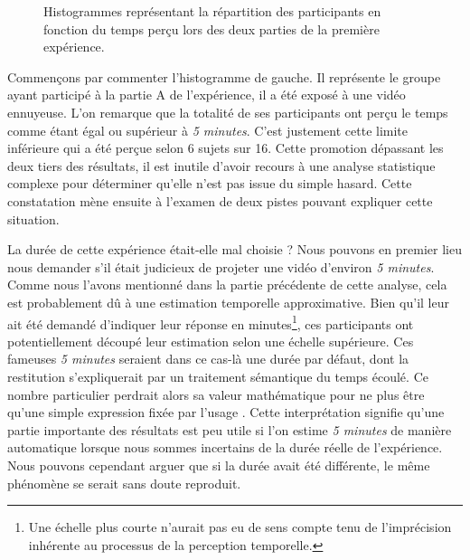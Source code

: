 \documentclass[12pt,fleqn,oneside,french,openany]{book} %
\begin{document}
\begin{figure}[h!]
\centering
\begin{minipage}[t]{.49\textwidth}
\end{minipage}
\hfill
\begin{minipage}[t]{.49\textwidth}
\end{minipage}
\caption{Histogrammes représentant la répartition des participants en fonction du temps perçu lors des deux parties de la première expérience.}
\end{figure}

Commençons par commenter l'histogramme de gauche. Il représente le groupe ayant participé à la partie A de l'expérience, il a été exposé à une vidéo ennuyeuse. L'on remarque que la totalité de ses participants ont perçu le temps comme étant égal ou supérieur à \emph{5 minutes}. C'est justement cette limite inférieure qui a été perçue selon 6 sujets sur 16. Cette promotion dépassant les deux tiers des résultats, il est inutile d'avoir recours à une analyse statistique complexe pour déterminer qu'elle n'est pas issue du simple hasard. Cette constatation mène ensuite à l'examen de deux pistes pouvant expliquer cette situation.

La durée de cette expérience était-elle mal choisie ? Nous pouvons en premier lieu nous demander s'il était judicieux de projeter une vidéo d'environ \emph{5 minutes}. Comme nous l'avons mentionné dans la partie précédente de cette analyse, cela est probablement dû à une estimation temporelle approximative. Bien qu'il leur ait été demandé d'indiquer leur réponse en minutes\footnote{Une échelle plus courte n'aurait pas eu de sens compte tenu de l'imprécision inhérente au processus de la perception temporelle.}, ces participants ont potentiellement découpé leur estimation selon une échelle supérieure. Ces fameuses \emph{5 minutes} seraient dans ce cas-là une durée par défaut, dont la restitution s'expliquerait par un traitement sémantique du temps écoulé. Ce nombre particulier perdrait alors sa valeur mathématique pour ne plus être qu'une simple expression fixée par l'usage \cite{durand1970}. Cette interprétation signifie qu'une partie importante des résultats est peu utile si l'on estime \emph{5 minutes} de manière automatique lorsque nous sommes incertains de la durée réelle de l'expérience. Nous pouvons cependant arguer que si la durée avait été différente, le même phénomène se serait sans doute reproduit. 
\end{document}
